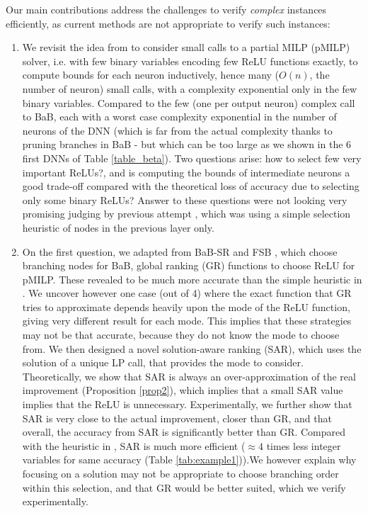 Our main contributions address the challenges to verify {\em complex} instances efficiently, as current methods are not appropriate to verify such instances:
\begin{enumerate}
	
	\item We revisit the idea from \cite{DivideAndSlide} to consider small calls to a partial MILP (pMILP) solver, i.e. with few binary variables encoding few ReLU functions exactly, to compute bounds for each neuron inductively, hence many ($O(n)$, the number of neuron) small calls, with a complexity exponential only in the few binary variables. Compared to the few (one per output neuron) complex call to BaB, each with a worst case complexity exponential in the number of neurons of the DNN (which is far from the actual complexity thanks to pruning branches in BaB - but which can be too large as we shown in the 6 first DNNs of Table \ref{table_beta}). Two questions arise: how to select few very important ReLUs?, and is computing the bounds of intermediate neurons a good trade-off compared with the theoretical loss of accuracy due to selecting only some binary ReLUs? Answer to these questions were not looking very promising judging by previous attempt \cite{DivideAndSlide}, which was using a simple selection heuristic of nodes in the previous layer only.

	\item On the first question, we adapted from BaB-SR \cite{BaB} and FSB \cite{FSB}, which choose branching nodes for BaB, global ranking (GR) functions to choose ReLU for pMILP. 
	These revealed to be much more accurate than the simple heuristic in 
	\cite{DivideAndSlide}. We uncover however one case (out of 4) where the exact function that GR tries to approximate depends heavily upon the mode of the ReLU function, giving very different result for each mode. This implies that these strategies may not be that accurate, because they do not know the mode to choose from. We then designed a novel solution-aware ranking (SAR), which uses the solution of a unique LP call, that provides the mode to consider. Theoretically, we show that SAR is always an over-approximation of the real improvement (Proposition \ref{prop2}), which implies that a small SAR value implies that the ReLU is unnecessary. Experimentally, we further show that SAR is very close to the actual improvement, closer than GR, and that overall, the accuracy from SAR is significantly better than GR.  Compared with the heuristic in \cite{DivideAndSlide}, SAR is much more efficient ($\approx 4$ times less integer variables for same accuracy (Table \ref{tab:example1})).We however explain why focusing on a solution may not be appropriate to choose branching order within this selection, and that GR would be better suited, which we verify experimentally.


\end{enumerate}
